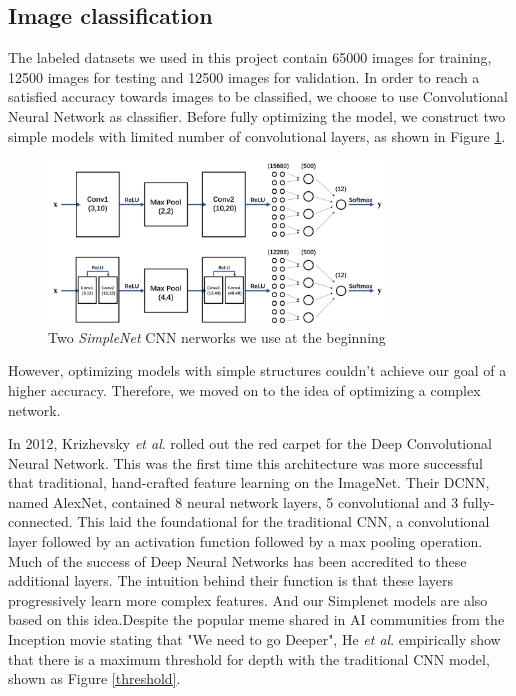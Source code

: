 \documentclass[12pt]{article}
\begin{document}
\subsection*{Image classification}
The labeled datasets we used in this project contain 65000 images for training, 12500 images for testing and 12500 images for validation. In order to reach a satisfied accuracy towards images to be classified, we choose to use Convolutional Neural Network as classifier. Before fully optimizing the model, we construct two simple models with limited number of convolutional layers, as shown in Figure \ref{simplenet}.
\begin{figure}[ht!]
\centering
\includegraphics[width=0.8\textwidth]{simplenet.png}
\caption{Two \textit{SimpleNet} CNN nerworks we use at the beginning}
\label{simplenet}
\end{figure}
\par
However, optimizing models with simple structures couldn't achieve our goal of a higher accuracy. Therefore, we moved on to the idea of optimizing a complex network.
\par
In 2012, Krizhevsky \textit{et al}\cite{krizhevsky2012imagenet}. rolled out the red carpet for the Deep Convolutional Neural Network. This was the first time this architecture was more successful that traditional, hand-crafted feature learning on the ImageNet. Their DCNN, named AlexNet, contained 8 neural network layers, 5 convolutional and 3 fully-connected. This laid the foundational for the traditional CNN, a convolutional layer followed by an activation function followed by a max pooling operation. Much of the success of Deep Neural Networks has been accredited to these additional layers. The intuition behind their function is that these layers progressively learn more complex features. And our Simplenet models are also based on this idea.Despite the popular meme shared in AI communities from the Inception movie stating that "We need to go Deeper", He \textit{et al}\cite{he2016deep}. empirically show that there is a maximum threshold for depth with the traditional CNN model, shown as Figure \ref{threshold}.
\end{document}
